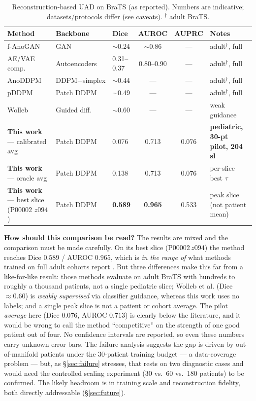 \documentclass[12pt, a4paper]{article}
\theoremstyle{definition}\newtheorem{definition}{Definition}
\begin{document}
\begin{table}[htbp]\centering\small
\caption{Reconstruction-based UAD on BraTS (as reported). Numbers are indicative;
datasets/protocols differ (see caveats). $^\dagger$ adult BraTS.}
\label{tab:lit}
\begin{tabularx}{\textwidth}{@{}lll cc X@{}}
\toprule
\textbf{Method} & \textbf{Backbone} & \textbf{Dice} & \textbf{AUROC} & \textbf{AUPRC} & \textbf{Notes}\\
\midrule
f-AnoGAN \cite{schlegl2019}      & GAN            & $\sim$0.24 & $\sim$0.86 & --- & adult$^\dagger$, full\\
AE/VAE comp.\ \cite{baur2021}    & Autoencoders   & 0.31--0.37 & 0.80--0.90 & --- & adult$^\dagger$, full\\
AnoDDPM \cite{wyatt2022}         & DDPM+simplex   & $\sim$0.44 & --- & --- & adult$^\dagger$, full\\
pDDPM \cite{behrendt2023}        & Patch DDPM     & $\sim$0.49 & --- & --- & adult$^\dagger$, full\\
Wolleb \cite{wolleb2022}         & Guided diff.   & $\sim$0.60 & --- & --- & weak guidance\\
\midrule
\textbf{This work} --- calibrated avg   & Patch DDPM     & 0.076 & 0.713 & 0.076 & \textbf{pediatric, 30-pt pilot, 204 sl}\\
\textbf{This work} --- oracle avg       & Patch DDPM     & 0.138 & 0.713 & 0.076 & per-slice best $\tau$\\
\textbf{This work} --- best slice (P00002 $z094$) & Patch DDPM  & \textbf{0.589} & \textbf{0.965} & 0.533 & peak slice (not patient mean)\\
\bottomrule
\end{tabularx}
\end{table}

\textbf{How should this comparison be read?} The results are mixed and the comparison
must be made carefully. On its best slice (P00002\,$z094$) the method reaches Dice
$0.589$ / AUROC $0.965$, which is \emph{in the range of} what methods trained on full
adult cohorts report \cite{wyatt2022,behrendt2023,wolleb2022}. But three differences make
this far from a like-for-like result: those methods evaluate on adult BraTS with hundreds
to roughly a thousand patients, not a single pediatric slice; Wolleb et al.
\cite{wolleb2022} (Dice $\approx0.60$) is \emph{weakly supervised} via classifier
guidance, whereas this work uses no labels; and a single peak slice is not a patient or
cohort average. The pilot \emph{average} here (Dice $0.076$, AUROC $0.713$) is clearly
below the literature, and it would be wrong to call the method ``competitive'' on the
strength of one good patient out of four. No confidence intervals are reported, so even
these numbers carry unknown error bars. The failure analysis suggests the gap is driven by
out-of-manifold patients under the 30-patient training budget --- a data-coverage problem
--- but, as §\ref{sec:failure} stresses, that rests on two diagnostic cases and would need
the controlled scaling experiment (30 vs.\ 60 vs.\ 180 patients) to be confirmed. The
likely headroom is in training scale and reconstruction fidelity, both directly
addressable (\S\ref{sec:future}).
\end{document}
